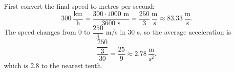 First convert the final speed to metres per second:
\[
300\ \dfrac{\text{km}}{\text{h}}=\dfrac{300\cdot1000\text{ m}}{3600\text{ s}}=\dfrac{250}{3}\ \dfrac{\text{m}}{\text{s}}\approx83.33\ \dfrac{\text{m}}{\text{s}}.
\]
The speed changes from $0$ to $\dfrac{250}{3}$ m/s in $30$ s, so the average acceleration is
\[
\dfrac{\dfrac{250}{3}}{30}=\dfrac{25}{9}\approx2.78\ \dfrac{\text{m}}{\text{s}^2},
\]
which is $\boxed{2.8}$ to the nearest tenth.

